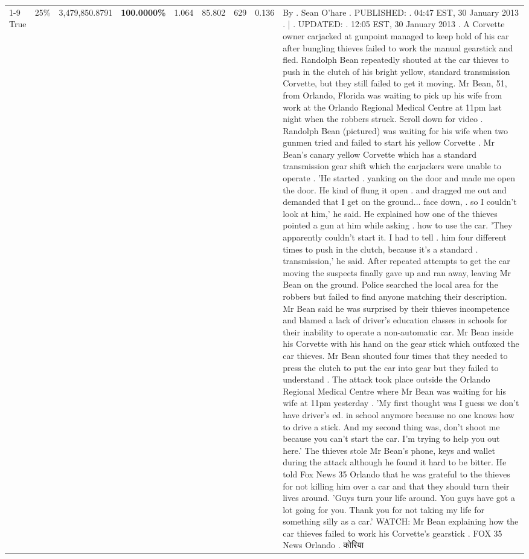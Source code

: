 \begin{table}[H]
\begin{tabular}{lllrlllll}
\cline{1-9} \cline{2-9}
True & 25\% & 3,479,850.8791 & \bfseries \color{red} 100.0000\% & 1.064 & 85.802 & 629 & 0.136 & By . Sean O'hare . PUBLISHED: . 04:47 EST, 30 January 2013 . | . UPDATED: . 12:05 EST, 30 January 2013 . A Corvette owner carjacked at gunpoint managed to keep hold of his car after bungling thieves failed to work the manual gearstick and fled. Randolph Bean repeatedly shouted at the car thieves to push in the clutch of his bright yellow, standard transmission Corvette, but they still failed to get it moving. Mr Bean, 51, from Orlando, Florida was waiting to pick up his wife from work at the Orlando Regional Medical Centre at 11pm last night when the robbers struck. Scroll down for video . Randolph Bean (pictured) was waiting for his wife when two gunmen tried and failed to start his yellow Corvette . Mr Bean's canary yellow Corvette which has a standard transmission gear shift which the carjackers were unable to operate . 'He started . yanking on the door and made me open the door. He kind of flung it open . and dragged me out and demanded that I get on the ground... face down, . so I couldn't look at him,' he said. He explained how one of the thieves pointed a gun at him while asking . how to use the car. 'They apparently couldn't start it. I had to tell . him four different times to push in the clutch, because it's a standard . transmission,' he said. After repeated attempts to get the car moving the suspects finally gave up and ran away, leaving Mr Bean on the ground. Police searched the local area for the robbers but failed to find anyone matching their description. Mr Bean said he was surprised by their thieves incompetence and blamed a lack of driver's education classes in schools for their inability to operate a non-automatic car. Mr Bean inside his Corvette with his hand on the gear stick which outfoxed the car thieves. Mr Bean shouted four times that they needed to press the clutch to put the car into gear but they failed to understand . The attack took place outside the Orlando Regional Medical Centre where Mr Bean was waiting for his wife at 11pm yesterday . 'My first thought was I guess we don't have driver's ed. in school anymore because no one knows how to drive a stick. And my second thing was, don't shoot me because you can't start the car. I'm trying to help you out here.' The thieves stole Mr Bean's phone, keys and wallet during the attack although he found it hard to be bitter. He told Fox News 35 Orlando that he was grateful to the thieves for not killing him over a car and that they should turn their lives around. 'Guys turn your life around. You guys have got a lot going for you. Thank you for not taking my life for something silly as a car.' WATCH: Mr Bean explaining how the car thieves failed to work his Corvette's gearstick . FOX 35 News Orlando . कोरिया \\

\end{tabular}
\end{table}
